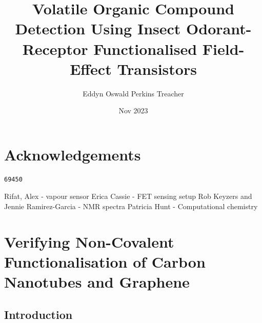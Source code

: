 \documentclass[
  a4paper,
]{scrbook}
\title{Volatile Organic Compound Detection Using Insect Odorant-Receptor
Functionalised Field-Effect Transistors}
\author{Eddyn Oswald Perkins Treacher}
\date{Nov 2023}
\renewcommand*\contentsname{Table of contents}
\newcommand\contentsname{Table of contents}
\begin{document}
\frontmatter
\maketitle
\ifdefined\Shaded\renewenvironment{Shaded}{\begin{tcolorbox}[boxrule=0pt, enhanced, interior hidden, borderline west={3pt}{0pt}{shadecolor}, sharp corners, frame hidden, breakable]}{\end{tcolorbox}}\fi

\renewcommand*\contentsname{Table of contents}
{
\setcounter{tocdepth}{2}
\tableofcontents
}
\mainmatter
{}

\hypertarget{acknowledgements}{%
\chapter*{Acknowledgements}\label{acknowledgements}}


\begin{verbatim}
69450
\end{verbatim}

Rifat, Alex - vapour sensor Erica Cassie - FET sensing setup Rob Keyzers
and Jennie Ramirez-Garcia - NMR spectra Patricia Hunt - Computational
chemistry


\hypertarget{verifying-non-covalent-functionalisation-of-carbon-nanotubes-and-graphene}{%
\chapter{Verifying Non-Covalent Functionalisation of Carbon Nanotubes
and
Graphene}\label{verifying-non-covalent-functionalisation-of-carbon-nanotubes-and-graphene}}

\hypertarget{introduction}{%
\section{Introduction}\label{introduction}}
\end{document}
